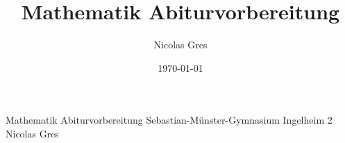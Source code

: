 \documentclass[oneside]{modern}
\title{Mathematik Abiturvorbereitung}
\author{Nicolas Gres}
\date{\today}
\begin{document}
\nocite{*}

\firstpage
{Mathematik Abiturvorbereitung}
{Sebastian-Münster-Gymnasium Ingelheim 2}
{Nicolas Gres}

\addtableofcontents

\newpage






\end{document}
